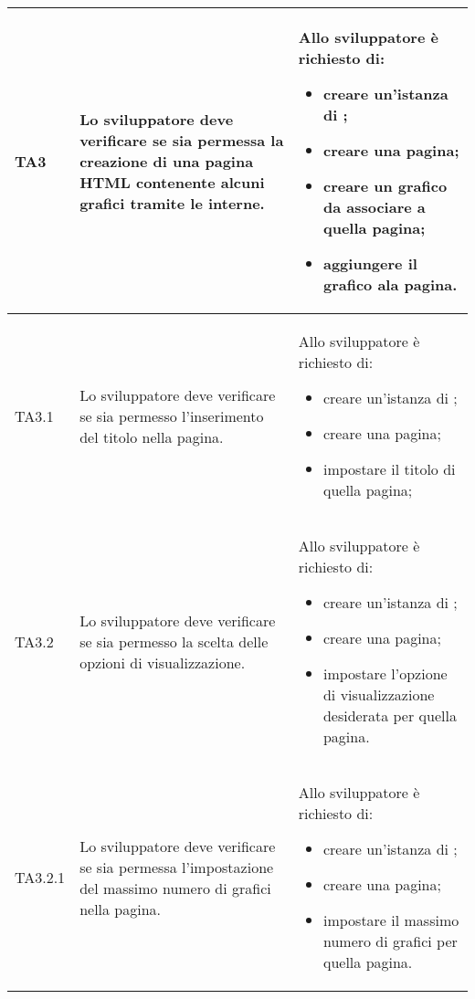 \begin{longtabu}{| X[0.5] | X | X |}
	TA3 & Lo sviluppatore deve verificare se sia permessa la creazione di una pagina HTML contenente alcuni grafici tramite le  interne.
		
		& Allo sviluppatore è richiesto di:
		\begin{itemize}
			\item creare un'istanza di \projectname{};
			\item creare una pagina;
			\item creare un grafico da associare a quella pagina;
			\item aggiungere il grafico ala pagina.
		\end{itemize}
\\ \hline

	TA3.1 & Lo sviluppatore deve verificare se sia permesso l'inserimento del titolo nella pagina.
		
		& Allo sviluppatore è richiesto di:
		\begin{itemize}
			\item creare un'istanza di \projectname{};
			\item creare una pagina;
			\item impostare il titolo di quella pagina;
		\end{itemize}
\\ \hline

	TA3.2 & Lo sviluppatore deve verificare se sia permesso la scelta delle opzioni di visualizzazione.
		
		& Allo sviluppatore è richiesto di:
		\begin{itemize}
			\item creare un'istanza di \projectname{};
			\item creare una pagina;
			\item impostare l'opzione di visualizzazione desiderata per quella pagina.
		\end{itemize}
\\ \hline

	TA3.2.1 & Lo sviluppatore deve verificare se sia permessa l'impostazione del massimo numero di grafici nella pagina.
		
		& Allo sviluppatore è richiesto di:
		\begin{itemize}
			\item creare un'istanza di \projectname{};
			\item creare una pagina;
			\item impostare il massimo numero di grafici per quella pagina.
		\end{itemize}
\\ \hline


\end{longtabu}
